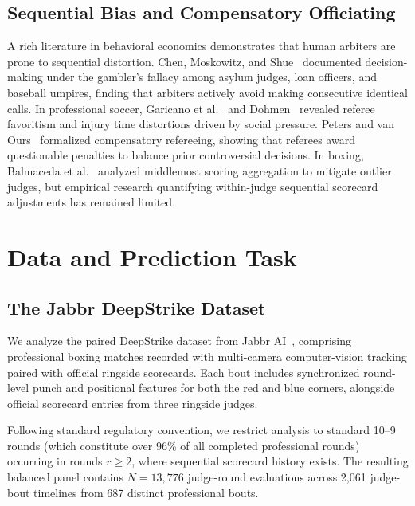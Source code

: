\documentclass[conference]{IEEEtran}
\begin{document}
\subsection{Sequential Bias and Compensatory Officiating}
A rich literature in behavioral economics demonstrates that human arbiters are prone to sequential distortion. Chen, Moskowitz, and Shue~\cite{chen2016} documented decision-making under the gambler's fallacy among asylum judges, loan officers, and baseball umpires, finding that arbiters actively avoid making consecutive identical calls. In professional soccer, Garicano et al.~\cite{garicano2005} and Dohmen~\cite{dohmen2008} revealed referee favoritism and injury time distortions driven by social pressure. Peters and van Ours~\cite{peters2014} formalized compensatory refereeing, showing that referees award questionable penalties to balance prior controversial decisions. In boxing, Balmaceda et al.~\cite{balmaceda2014} analyzed middlemost scoring aggregation to mitigate outlier judges, but empirical research quantifying within-judge sequential scorecard adjustments has remained limited.

\section{Data and Prediction Task}
\subsection{The Jabbr DeepStrike Dataset}
We analyze the paired DeepStrike dataset from Jabbr AI~\cite{jabbr2023}, comprising professional boxing matches recorded with multi-camera computer-vision tracking paired with official ringside scorecards. Each bout includes synchronized round-level punch and positional features for both the red and blue corners, alongside official scorecard entries from three ringside judges. 

Following standard regulatory convention, we restrict analysis to standard 10--9 rounds (which constitute over 96\% of all completed professional rounds) occurring in rounds $r \ge 2$, where sequential scorecard history exists. The resulting balanced panel contains $N = 13,776$ judge-round evaluations across 2,061 judge-bout timelines from 687 distinct professional bouts.
\end{document}
